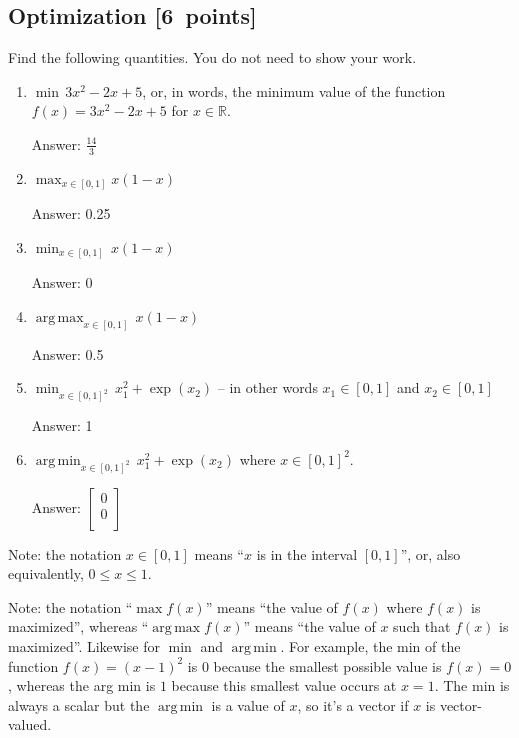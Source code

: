 \documentclass{article}
\newcommand{\blu}[1]{{\textcolor{blu}{#1}}}
\newenvironment{answer}{\par\begingroup\color{gre}Answer: }{\endgroup}
\let\ask\blu
\newcommand\pts[1]{\textcolor{pointscolour}{[#1~points]}}
\def\R{\mathbb{R}}
\DeclareMathOperator*{\argmax}{arg\,max}
\DeclareMathOperator*{\argmin}{arg\,min}
\begin{document}
  \subsection{Optimization \pts{6}}

  \ask{Find the following quantities.} You do not need to show your work.

  \begin{enumerate}
  \item $\min \, 3x^2-2x+5$, or, in words, the minimum value of the function $f(x) = 3x^2 -2x + 5$ for $x \in \R$.
  \begin{answer}
    $\frac{14}{3}$
  \end{answer}
  \item $\max_{x \in [0, 1]} x(1-x)$
  \begin{answer}
    0.25
  \end{answer}
  \item $\min_{x \in [0, 1]} \, x(1-x)$
  \begin{answer}
    0
  \end{answer}
  \item $\argmax_{x \in [0,1]} \, x(1-x)$
  \begin{answer}
    0.5
  \end{answer}
  \item $\min_{x \in [0, 1]^2} \, x_1^2 + \exp(x_2)$ -- in other words $x_1\in [0,1]$ and $x_2\in [0,1]$
  \begin{answer}
    1
  \end{answer}
  \item $\argmin_{x \in [0,1]^2} \, x_1^2 + \exp(x_2)$ where $x \in [0,1]^2$.
  \begin{answer}
    $ \left[ \begin{array}{c}
      0\\
      0\\
    \end{array} \right]$
  \end{answer}
  \end{enumerate}

  Note: the notation $x\in [0,1]$ means ``$x$ is in the interval $[0,1]$'', or, also equivalently, $0 \leq x \leq 1$.

  Note: the notation ``$\max f(x)$'' means ``the value of $f(x)$ where $f(x)$ is maximized'', whereas ``$\argmax  f(x)$'' means ``the value of $x$ such that $f(x)$ is maximized''.
  Likewise for $\min$ and $\argmin$. For example, the min of the function $f(x)=(x-1)^2$ is $0$ because the smallest possible value is $f(x)=0$,
  whereas the arg min is $1$ because this smallest value occurs at $x=1$. The min is always a scalar but the $\argmin$ is a value of $x$, so it's a vector
  if $x$ is vector-valued.
\end{document}
